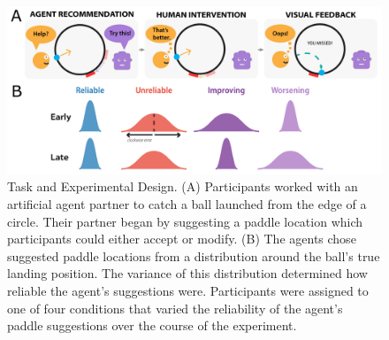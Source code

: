 \documentclass[10pt,letterpaper]{article}
\begin{document}
\begin{figure}[hbtp]
\vspace{-8mm}
\includegraphics[width=\textwidth]{img/expt_overview.pdf} 
\vspace{-4mm}
\caption{Task and Experimental Design. (A) Participants worked with an artificial agent partner to catch a ball launched from the edge of a circle. Their partner began by suggesting a paddle location which participants could either accept or modify. (B) The agents chose suggested paddle locations from a distribution around the ball's true landing position. The variance of this distribution determined how reliable the agent's suggestions were. Participants were assigned to one of four conditions that varied the reliability of the agent's paddle suggestions over the course of the experiment.} 
\label{fig:stimuli}
\end{figure}
\end{document}
